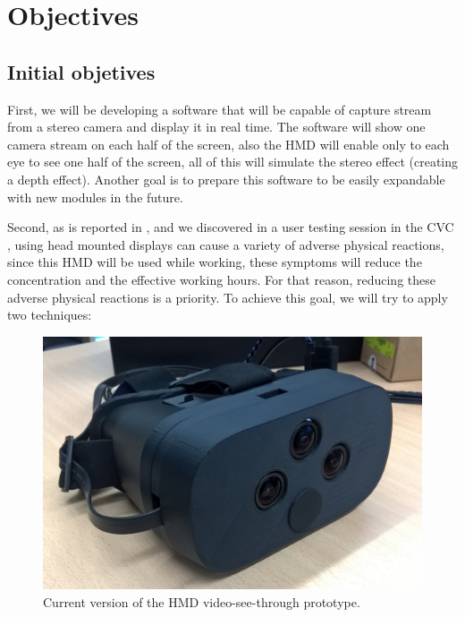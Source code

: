 \documentclass[10pt,a4paper,twocolumn,twoside]{article}
\begin{document}
	
	
	\section{Objectives}
	
	\subsection{Initial objetives}
	First, we will be developing a software that will be capable of capture stream from a stereo camera and display it in real time. The software will show one camera stream on each half of the screen, also the HMD will enable only to each eye to see one half of the screen, all of this will simulate the stereo effect (creating a depth effect). Another goal is to prepare this software to be easily expandable with new modules in the future.
	
	Second, as is reported in \cite{disconfortReview}, and we discovered in a user testing session in the CVC \cite{unpublishCVC}, using head mounted displays can cause a variety of adverse physical reactions, since this HMD will be used while working, these symptoms will reduce the concentration and the effective working hours. For that reason, reducing these adverse physical reactions is a priority. To achieve this goal, we will try to apply two techniques: 
	
	\begin{figure}
		\centering
		\includegraphics[width=1\linewidth]{img/imagenproto3.jpg}
		\caption{Current version of the HMD video-see-through prototype.}
		\label{fig:proto}
	\end{figure}
	
\end{document}
